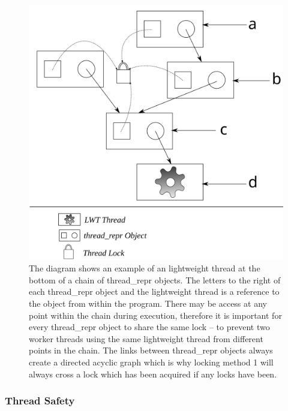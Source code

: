 \documentclass[12pt,twoside,notitlepage]{report}
\begin{document}
\begin{figure}[h!]
\includegraphics[width=\linewidth]{thread_repr}
\caption[Layered thread\_repr diagram]{The diagram shows an example of an lightweight thread at the bottom of a chain of thread\_repr objects. The letters to the right of each thread\_repr object and the lightweight thread is a reference to the object from within the program. There
may be access at any point within the chain during execution, therefore it is important for every thread\_repr object to share the same lock -- to prevent two worker threads using the same lightweight thread from different points in the
chain. The links between thread\_repr objects always create a directed acyclic graph which is why locking method 1 will always cross a lock which has been acquired if any locks have been.}
\label{fig:thread_repr}
\end{figure}

%
%

%
%
\subsubsection{Thread Safety}
\label{subsubsec:thread_safety}
%
%
\end{document}
